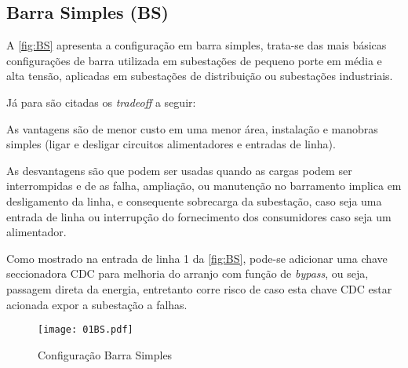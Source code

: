 		\subsection{Barra Simples (BS)}
			A \autoref{fig:BS} apresenta a configuração em barra simples, trata-se das mais básicas configurações de barra utilizada em subestações de pequeno porte em média e alta tensão, aplicadas em subestações de distribuição ou subestações industriais.\par
			Já para  são citadas os \textit{tradeoff} a seguir:\par
			As vantagens são de menor custo em uma menor área, instalação e manobras simples (ligar e desligar circuitos alimentadores e entradas de linha).\par
			As desvantagens são que podem ser usadas quando as cargas podem ser interrompidas e de as falha, ampliação, ou manutenção no barramento implica em desligamento da linha, e consequente sobrecarga da subestação, caso seja uma entrada de linha ou interrupção do fornecimento dos consumidores caso seja um alimentador.\par
			Como mostrado na entrada de linha 1 da \autoref{fig:BS}, pode-se adicionar uma chave seccionadora CDC para melhoria do arranjo com função de \textit{bypass}, ou seja, passagem direta da energia, entretanto corre risco de caso esta chave CDC estar acionada expor a subestação a falhas.\par 
			\begin{figure}[!htb]
				\caption{Configuração Barra Simples}
				\centering
				\texttt{[image: 01BS.pdf]}
				\label{fig:BS}
				\end{figure}
